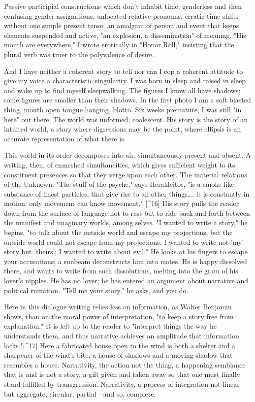 \documentclass[
]{memoir}
\begin{document}
Passive participial constructions which don't inhabit time, genderless
and then confusing gender assignations, unlocated relative pronouns,
erratic time shifts without one simple present tense: an amalgam of
person and event that keeps elements suspended and active, "an
explosion, a dissemination" of meaning. "His mouth are everywhere," I
wrote erotically in "Honor Roll," insisting that the plural verb was
truer to the polyvalence of desire.

And I have neither a coherent story to tell nor can I cop a coherent
attitude to give my voice a characteristic singularity. I was born in
sleep and raised in sleep and wake up to find myself sleepwalking. The
figures I know all have shadows; some figures are smaller than their
shadows. In the first photo I am a soft blasted thing, mouth open tongue
hanging, blotto. Six weeks premature, I was still "in here" out there.
The world was unformed, coalescent. His story is the story of an
intuited world, a story where digressions may be the point, where
ellipsis is an accurate representation of what there is.

This world in its order decomposes into air, simultaneously present and
absent. A writing, then, of enmeshed simultaneities, which gives
sufficient weight to its constituent presences so that they verge upon
each other. The material relations of the Unknown. "The stuff of the
psyche," says Herakleitos, "is a smoke-like substance of finest
particles, that give rise to all other things\ldots{}. it is constantly
in motion: only movement can know movement." {[}\^{}16{]} His story
pulls the reader down from the surface of language not to rest but to
ride back and forth between the manifest and imaginary worlds, among
selves. "I wanted to write a story," he begins, "to talk about the
outside world and escape my projections, but the outside world could not
escape from my projections. I wanted to write not 'my' story but
'theirs'; I wanted to write about evil." He looks at his fingers to
escape your accusations; a sunbeam deconstructs him into motes. He is
happy dissolved there, and wants to write from such dissolutions,
melting into the grain of his lover's nipples. He has no lover; he has
entered an argument about narrative and political ruination. "Tell me
your story," he asks, and you do.

Here in this dialogue writing relies less on information, as Walter
Benjamin shows, than on the moral power of interpretation, "to keep a
story free from explanation." It is left up to the reader to "interpret
things the way he understands them, and thus narrative achieves an
amplitude that information lacks."{[}\^{}17{]} Here a fabricated house
open to the wind is both a shelter and a sharpener of the wind's bite, a
house of shadows and a moving shadow that resembles a house.
Narrativity, the action not the thing, a happening semblance that is and
is not a story, a gift given and taken away so that one must finally
stand fulfilled by transgression. Narrativity, a process of integration
not linear but aggregate, circular, partial---and so, complete.
\end{document}
